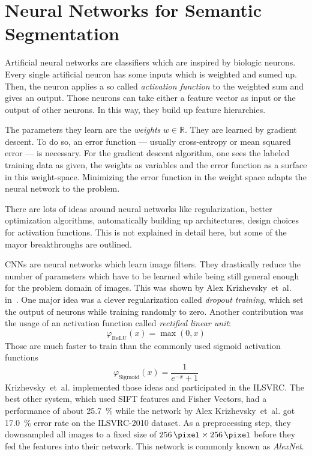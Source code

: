 
\section{Neural Networks for Semantic Segmentation}\label{sec:nn}

Artificial neural networks are classifiers which are inspired by biologic
neurons. Every single artificial neuron has some inputs which is weighted and
sumed up. Then, the neuron applies a so called \textit{activation function} to
the weighted sum and gives an output. Those neurons can take either a feature
vector as input or the output of other neurons. In this way, they build up
feature hierarchies.

The parameters they learn are the \textit{weights} $w \in \mathbb{R}$. They are
learned by gradient descent. To do so, an error function --- usually
cross-entropy or mean squared error --- is necessary. For the gradient descent
algorithm, one sees the labeled training data as given, the weights as
variables and the error function as a surface in this weight-space. Minimizing
the error function in the weight space adapts the neural network to the
problem.

There are lots of ideas around neural networks like regularization, better
optimization algorithms, automatically building up architectures, design
choices for activation functions. This is not explained in detail here, but
some of the mayor breakthroughs are outlined.

\Glspl{CNN} are neural networks which learn image filters. They drastically
reduce the number of parameters which have to be learned while being still
general enough for the problem domain of images. This was shown by Alex
Krizhevsky~et~al. in~\cite{krizhevsky2012imagenet}. One major idea was a clever
regularization called \textit{dropout training}, which set the output of
neurons while training randomly to zero. Another contribution was the usage of
an activation function called \textit{rectified linear unit}:
\[\varphi_{\text{ReLU}}(x) = \max(0, x)\]
Those are much faster to train than the commonly used sigmoid activation
functions
\[\varphi_{\text{Sigmoid}}(x) = \frac{1}{e^{-x} + 1}\]
Krizhevsky~et~al. implemented those ideas and participated in the
\gls{ILSVRC}. The best other system, which used SIFT features and Fisher
Vectors, had a performance of about \SI{25.7}{\percent} while the network by
Alex Krizhevsky~et~al. got \SI{17.0}{\percent} error rate on the ILSVRC-2010
dataset. As a preprocessing step, they downsampled all images to a fixed size
of $\SI{256}{\pixel} \times \SI{256}{\pixel}$ before they fed the features into
their network. This network is commonly known as \textit{AlexNet}.

